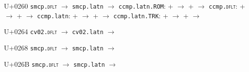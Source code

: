 \documentclass{article}
\begin{document}
\begin{substitutions}
U+0260  \linebreak
    \texttt{smcp.\textsc{dflt}} $\to$  \linebreak
    \texttt{smcp.latn} $\to$  \linebreak
\texttt{ccmp.latn.ROM}:
\linebreak\null\quad{} \space +  \space $\to$  
\linebreak\null\quad{} \space +  \space $\to$  
\linebreak
\texttt{ccmp.\textsc{dflt}}:
\linebreak\null\quad{} \space +  \space $\to$  
\linebreak\null\quad{} \space +  \space $\to$  
\linebreak
\texttt{ccmp.latn}:
\linebreak\null\quad{} \space +  \space $\to$  
\linebreak\null\quad{} \space +  \space $\to$  
\linebreak
\texttt{ccmp.latn.TRK}:
\linebreak\null\quad{} \space +  \space $\to$  
\linebreak\null\quad{} \space +  \space $\to$  


\goodbreak

U+0264  \linebreak
    \texttt{cv02.\textsc{dflt}} $\to$  \linebreak
    \texttt{cv02.latn} $\to$  

\goodbreak

U+0268  \linebreak
    \texttt{smcp.\textsc{dflt}} $\to$  \linebreak
    \texttt{smcp.latn} $\to$  

\goodbreak

U+026B  \linebreak
    \texttt{smcp.\textsc{dflt}} $\to$  \linebreak
    \texttt{smcp.latn} $\to$  


\end{substitutions}
\end{document}
